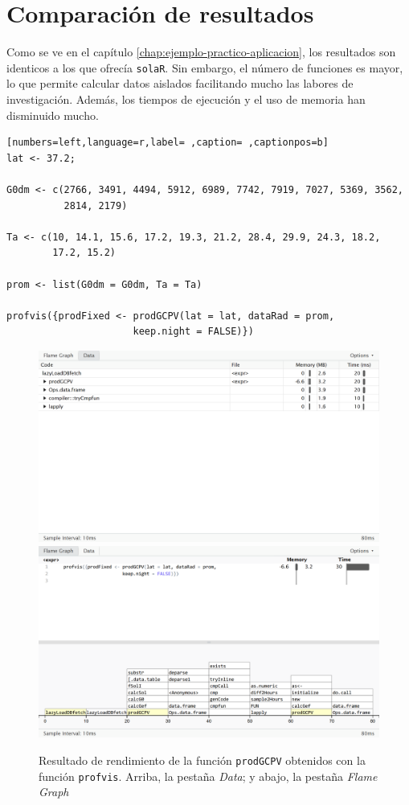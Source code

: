 \section{Comparación de resultados}
\label{sec:orgbee4992}
Como se ve en el capítulo \ref{chap:ejemplo-practico-aplicacion}, los resultados son identicos a los que ofrecía \texttt{solaR}. Sin embargo, el número de funciones es mayor, lo que permite calcular datos aislados facilitando mucho las labores de investigación. Además, los tiempos de ejecución y el uso de memoria han disminuido mucho.
\begin{lstlisting}[numbers=left,language=r,label= ,caption= ,captionpos=b]
lat <- 37.2;

G0dm <- c(2766, 3491, 4494, 5912, 6989, 7742, 7919, 7027, 5369, 3562,
          2814, 2179)

Ta <- c(10, 14.1, 15.6, 17.2, 19.3, 21.2, 28.4, 29.9, 24.3, 18.2,
        17.2, 15.2)

prom <- list(G0dm = G0dm, Ta = Ta)

profvis({prodFixed <- prodGCPV(lat = lat, dataRad = prom,
                      keep.night = FALSE)})
\end{lstlisting}

\begin{figure}[h!]
  \centering
    \includegraphics[width=\textwidth]{figuras/data.png}
    \includegraphics[width=\textwidth]{figuras/flamegraph.png}
  \caption{Resultado de rendimiento de la función \texttt{prodGCPV} obtenidos con la función \texttt{profvis}. Arriba, la pestaña \textit{Data}; y abajo, la pestaña \textit{Flame Graph}}
\end{figure}

